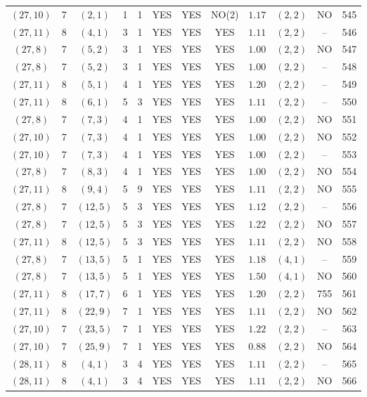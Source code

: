 \begin{longtable}{|c|c|c|c|c|c|c|c|c|c|c|c|}
$(27,10)$ & 7 & $(2,1)$ & 1 & 1 & YES & YES & NO(2) & $1.17$ & $(2,2)$ & NO & 545\\
$(27,11)$ & 8 & $(4,1)$ & 3 & 1 & YES & YES & YES & $1.11$ & $(2,2)$ & -- & 546\\
$(27,8)$ & 7 & $(5,2)$ & 3 & 1 & YES & YES & YES & $1.00$ & $(2,2)$ & NO & 547\\
$(27,8)$ & 7 & $(5,2)$ & 3 & 1 & YES & YES & YES & $1.00$ & $(2,2)$ & -- & 548\\
$(27,11)$ & 8 & $(5,1)$ & 4 & 1 & YES & YES & YES & $1.20$ & $(2,2)$ & -- & 549\\
$(27,11)$ & 8 & $(6,1)$ & 5 & 3 & YES & YES & YES & $1.11$ & $(2,2)$ & -- & 550\\
$(27,8)$ & 7 & $(7,3)$ & 4 & 1 & YES & YES & YES & $1.00$ & $(2,2)$ & NO & 551\\
$(27,10)$ & 7 & $(7,3)$ & 4 & 1 & YES & YES & YES & $1.00$ & $(2,2)$ & NO & 552\\
$(27,10)$ & 7 & $(7,3)$ & 4 & 1 & YES & YES & YES & $1.00$ & $(2,2)$ & -- & 553\\
$(27,8)$ & 7 & $(8,3)$ & 4 & 1 & YES & YES & YES & $1.00$ & $(2,2)$ & NO & 554\\
$(27,11)$ & 8 & $(9,4)$ & 5 & 9 & YES & YES & YES & $1.11$ & $(2,2)$ & NO & 555\\
$(27,8)$ & 7 & $(12,5)$ & 5 & 3 & YES & YES & YES & $1.12$ & $(2,2)$ & -- & 556\\
$(27,8)$ & 7 & $(12,5)$ & 5 & 3 & YES & YES & YES & $1.22$ & $(2,2)$ & NO & 557\\
$(27,11)$ & 8 & $(12,5)$ & 5 & 3 & YES & YES & YES & $1.11$ & $(2,2)$ & NO & 558\\
$(27,8)$ & 7 & $(13,5)$ & 5 & 1 & YES & YES & YES & $1.18$ & $(4,1)$ & -- & 559\\
$(27,8)$ & 7 & $(13,5)$ & 5 & 1 & YES & YES & YES & $1.50$ & $(4,1)$ & NO & 560\\
$(27,11)$ & 8 & $(17,7)$ & 6 & 1 & YES & YES & YES & $1.20$ & $(2,2)$ & 755 & 561\\
$(27,11)$ & 8 & $(22,9)$ & 7 & 1 & YES & YES & YES & $1.11$ & $(2,2)$ & NO & 562\\
$(27,10)$ & 7 & $(23,5)$ & 7 & 1 & YES & YES & YES & $1.22$ & $(2,2)$ & -- & 563\\
$(27,10)$ & 7 & $(25,9)$ & 7 & 1 & YES & YES & YES & $0.88$ & $(2,2)$ & NO & 564\\
$(28,11)$ & 8 & $(4,1)$ & 3 & 4 & YES & YES & YES & $1.11$ & $(2,2)$ & -- & 565\\
$(28,11)$ & 8 & $(4,1)$ & 3 & 4 & YES & YES & YES & $1.11$ & $(2,2)$ & NO & 566\\

\end{longtable}
